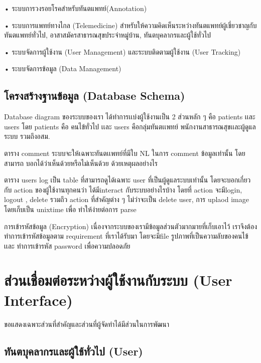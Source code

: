 • ระบบการวงรอยโรคสําหรับทันตแพทย์(Annotation)

• ระบบการแพทย์ทางไกล (Telemedicine) สําหรับให้ความคิดเห็นระหว่างทันตแพทย์ผู้เชี่ยวชาญกับ
ทันตแพทย์ทั่วไป, อาสาสมัครสาธารณสุขประจําหมู่บ้าน, ทันตบุคลากรและผู้ใช้ทั่วไป

• ระบบจัดการผู้ใช้งาน (User Management) และระบบติดตามผู้ใช้งาน (User Tracking)

• ระบบจัดการข้อมูล (Data Management)

\subsection{โครงสร้างฐานข้อมูล (Database Schema)}

Database diagram ของระบบของเรา ได้ทําการเเบ่งผู้ใช้งานเป็น 2 ส่วนหลัก ๆ คือ patients เเละ
users โดย patients คือ คนไข้ทั่วไป เเละ users คือกลุ่มทันตเเพทย์ พนักงานสาธารณสุขเเละผู้ดูแลระบบ
รวมถึงอสม.

ตาราง comment ระบบจะให้เฉพาะทันตเเพทย์ที่มีใบ NL ในการ comment ข้อมูลเท่านั้น โดยสามารถ
บอกได้ว่าเห็นด้วยหรือไม่เห็นด้วย ด้วยเหตุผลอย่างไร

ตาราง users log เป็น table ที่สามารถดูได้เฉพาะ user ที่เป็นผู้ดูแลระบบเท่านั้น โดยจะบอกเกี่ยวกับ
action ของผู้ใช้งานทุกคนว่า ได้มีinteract กับระบบอย่างไรบ้าง โดยที่ action จะมีlogin, logout , delete
รวมถึว action ที่สําคัญต่าง ๆ ไม่ว่าจะเป็น delete user, การ uplaod image โดยเก็บเป็น unixtime เพื่อ
ทําให้ง่ายต่อการ parse

การเข้ารหัสข้อมูล (Encryption) เนื่องจากระบบของเรามีข้อมูลส่วนตัวมากมายที่เก็บเอาไว้ เราจึงต้อง
ทําการเข้ารหัสข้อมูลตาม requirement ที่เราได้รับมา โดยจะมีfile รูปภาพที่เป็นความลับของคนไข้เเละ
ทําการเข้ารหัส password เพื่อความปลอดภัย

\section{ส่วนเชื่อมต่อระหว่างผู้ใช้งานกับระบบ (User Interface)}

ขอแสดงเฉพาะส่วนที่สำคัญและส่วนที่ผู้จัดทำได้มีส่วนในการพัฒนา
\subsection{ทันตบุคลากรและผู้ใช้ทั่วไป (User)}
